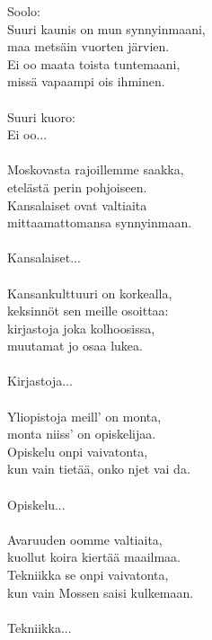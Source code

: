 
Soolo: \\ Suuri kaunis on mun synnyinmaani, \\ maa metsäin vuorten järvien. \\ Ei oo maata toista tuntemaani, \\ missä vapaampi ois ihminen. \\ \hspace{10mm} \\ Suuri kuoro: \\ Ei oo... \\ \hspace{10mm} \\ Moskovasta rajoillemme saakka, \\ etelästä perin pohjoiseen. \\ Kansalaiset ovat valtiaita \\ mittaamattomansa synnyinmaan. \\ \hspace{10mm} \\ Kansalaiset... \\ \hspace{10mm} \\ Kansankulttuuri on korkealla, \\ keksinnöt sen meille osoittaa: \\ kirjastoja joka kolhoosissa, \\ muutamat jo osaa lukea. \\ \hspace{10mm} \\ Kirjastoja... \\ \hspace{10mm} \\ Yliopistoja meill' on monta, \\ monta niiss' on opiskelijaa. \\ Opiskelu onpi vaivatonta, \\ kun vain tietää, onko njet vai da. \\ \hspace{10mm} \\ Opiskelu... \\ \hspace{10mm} \\ Avaruuden oomme valtiaita, \\ kuollut koira kiertää maailmaa. \\ Tekniikka se onpi vaivatonta, \\ kun vain Mossen saisi kulkemaan. \\ \hspace{10mm} \\ Tekniikka... \\ 